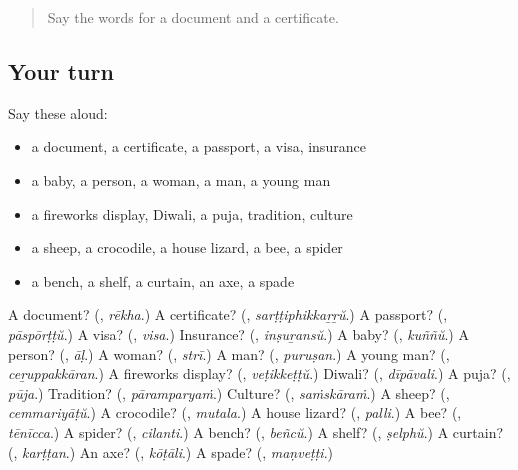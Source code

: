 \label{lesson:ML-R328-second-pass-words-from-chapters-324-328}



\begin{quote}
Say the words for a document and a certificate.
\end{quote}

\subsection*{Your turn}
Say these aloud:

\begin{itemize}
\raggedright
  \item a document, a certificate, a passport, a visa, insurance
  \item a baby, a person, a woman, a man, a young man
  \item a fireworks display, Diwali, a puja, tradition, culture
  \item a sheep, a crocodile, a house lizard, a bee, a spider
  \item a bench, a shelf, a curtain, an axe, a spade
\end{itemize}

\begin{tcolorbox}[breakable,colback=teal!4,colframe=teal!35!black,title={Before you move on}]
A document? (\textbf{}, \emph{rēkha}.) A certificate? (\textbf{}, \emph{sarṭṭiphikkaṟṟŭ}.) A passport? (\textbf{}, \emph{pāspōrṭṭŭ}.) A visa? (\textbf{}, \emph{visa}.) Insurance? (\textbf{}, \emph{inṣuṟansŭ}.) A baby? (\textbf{}, \emph{kuññŭ}.) A person? (\textbf{}, \emph{āḷ}.) A woman? (\textbf{}, \emph{strī}.) A man? (\textbf{}, \emph{puruṣan}.) A young man? (\textbf{}, \emph{ceṟuppakkāran}.) A fireworks display? (\textbf{}, \emph{veṭikkeṭṭŭ}.) Diwali? (\textbf{}, \emph{dīpāvali}.) A puja? (\textbf{}, \emph{pūja}.) Tradition? (\textbf{}, \emph{pāramparyaṁ}.) Culture? (\textbf{}, \emph{saṁskāraṁ}.) A sheep? (\textbf{}, \emph{cemmariyāṭŭ}.) A crocodile? (\textbf{}, \emph{mutala}.) A house lizard? (\textbf{}, \emph{palli}.) A bee? (\textbf{}, \emph{tēnīcca}.) A spider? (\textbf{}, \emph{cilanti}.) A bench? (\textbf{}, \emph{beñcŭ}.) A shelf? (\textbf{}, \emph{ṣelphŭ}.) A curtain? (\textbf{}, \emph{karṭṭan}.) An axe? (\textbf{}, \emph{kōṭāli}.) A spade? (\textbf{}, \emph{maṇveṭṭi}.)
\end{tcolorbox}
